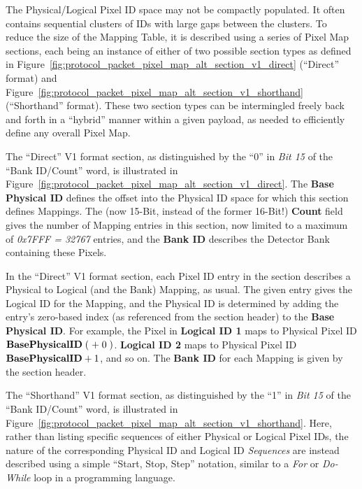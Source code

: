 
The Physical/Logical Pixel ID space may not be compactly populated.
It often contains sequential clusters of IDs with large gaps
between the clusters.
To reduce the size of the Mapping Table,
it is described using a series of Pixel Map sections,
each being an instance of either of two possible section types as defined
in Figure~\ref{fig:protocol_packet_pixel_map_alt_section_v1_direct}
(``Direct'' format)
and Figure~\ref{fig:protocol_packet_pixel_map_alt_section_v1_shorthand}
(``Shorthand'' format).
These two section types can be intermingled freely back and forth
in a ``hybrid'' manner within a given payload,
as needed to efficiently define any overall Pixel Map.

The ``Direct'' V1 format section,
as distinguished by the ``0'' in {\it Bit 15}
of the ``Bank ID/Count'' word,
is illustrated in
Figure~\ref{fig:protocol_packet_pixel_map_alt_section_v1_direct}.
The {\bf Base Physical ID} defines the offset into the Physical ID space
for which this section defines Mappings.
The (now 15-Bit, instead of the former 16-Bit!) {\bf Count} field
gives the number of Mapping entries in this section,
now limited to a maximum of {\it 0x7FFF = 32767} entries,
and the {\bf Bank ID} describes the
Detector Bank containing these Pixels.

In the ``Direct'' V1 format section,
each Pixel ID entry in the section describes a Physical to Logical
(and the Bank) Mapping, as usual.
The given entry gives the Logical ID for the Mapping,
and the Physical ID is determined by adding the entry's zero-based index
(as referenced from the section header)
to the {\bf Base Physical ID}.
For example, the Pixel in {\bf Logical ID 1} maps
to Physical Pixel ID ${\bf Base Physical ID} \; (\; + \; 0 \;)$.
{\bf Logical ID 2} maps
to Physical Pixel ID ${\bf Base Physical ID} + 1$,
and so on.
The {\bf Bank ID} for each Mapping is given by the section header.

The ``Shorthand'' V1 format section,
as distinguished by the ``1'' in {\it Bit 15}
of the ``Bank ID/Count'' word,
is illustrated in
Figure~\ref{fig:protocol_packet_pixel_map_alt_section_v1_shorthand}.
Here, rather than listing specific sequences of either
Physical or Logical Pixel IDs,
the nature of the corresponding Physical ID and Logical ID {\it Sequences}
are instead described using a simple ``Start, Stop, Step'' notation,
similar to a {\it For} or {\it Do-While} loop in a programming language.

